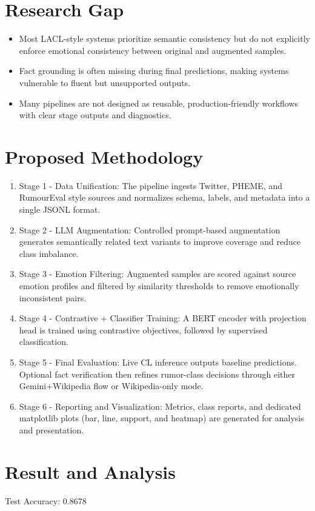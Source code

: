 \documentclass[12pt,a4paper]{report}
\begin{document}
\chapter{Research Gap}
\begin{itemize}
\item Most LACL-style systems prioritize semantic consistency but do not explicitly enforce emotional consistency between original and augmented samples.
\item Fact grounding is often missing during final predictions, making systems vulnerable to fluent but unsupported outputs.
\item Many pipelines are not designed as reusable, production-friendly workflows with clear stage outputs and diagnostics.
\end{itemize}

\chapter{Proposed Methodology}
\begin{enumerate}
\item Stage 1 - Data Unification: The pipeline ingests Twitter, PHEME, and RumourEval style sources and normalizes schema, labels, and metadata into a single JSONL format.
\item Stage 2 - LLM Augmentation: Controlled prompt-based augmentation generates semantically related text variants to improve coverage and reduce class imbalance.
\item Stage 3 - Emotion Filtering: Augmented samples are scored against source emotion profiles and filtered by similarity thresholds to remove emotionally inconsistent pairs.
\item Stage 4 - Contrastive + Classifier Training: A BERT encoder with projection head is trained using contrastive objectives, followed by supervised classification.
\item Stage 5 - Final Evaluation: Live CL inference outputs baseline predictions. Optional fact verification then refines rumor-class decisions through either Gemini+Wikipedia flow or Wikipedia-only mode.
\item Stage 6 - Reporting and Visualization: Metrics, class reports, and dedicated matplotlib plots (bar, line, support, and heatmap) are generated for analysis and presentation.
\end{enumerate}

\chapter{Result and Analysis}
Test Accuracy: 0.8678\\
\end{document}
